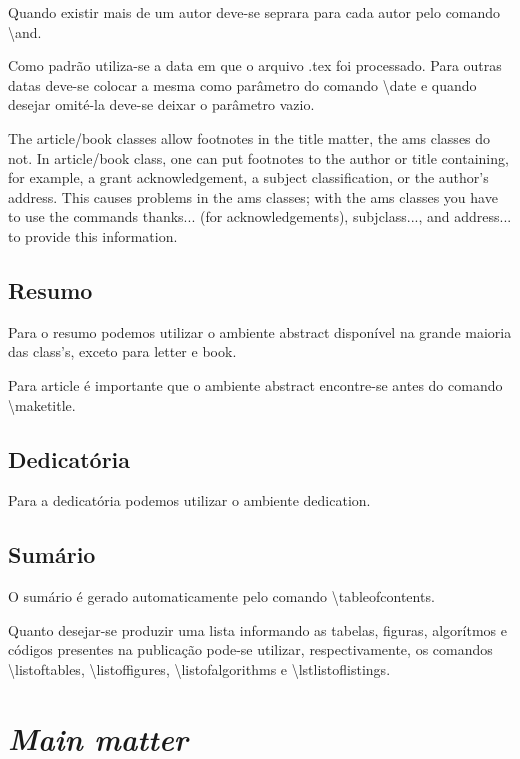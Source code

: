 Quando existir mais de um autor deve-se seprara para cada autor pelo comando \textbackslash\textsf{and}.

Como padrão utiliza-se a data em que o arquivo \textsf{.tex} foi processado. Para outras  datas deve-se colocar a mesma como parâmetro do comando \textbackslash\textsf{date} e quando desejar omité-la deve-se deixar o parâmetro vazio.

The article/book classes allow footnotes in the title matter, the ams classes do not. In article/book class, one can put footnotes to the author or title containing, for example, a grant acknowledgement, a subject classification, or the author's address. This causes problems in the ams classes; with the ams classes you have to use the commands thanks{...} (for acknowledgements), subjclass{...}, and address{...} to provide this information.

\subsection{Resumo}

Para o resumo podemos utilizar o ambiente \textsf{abstract} disponível na grande maioria das \textsf{class}'s, exceto para \textsf{letter} e \textsf{book}.

Para \textsf{article} é importante que o ambiente \textsf{abstract} encontre-se antes do comando \textbackslash\textsf{maketitle}.

\subsection{Dedicatória}

Para a dedicatória podemos utilizar o ambiente \textsf{dedication}.

\subsection{Sumário}

O sumário é gerado automaticamente pelo comando \textbackslash\textsf{tableofcontents}.

Quanto desejar-se produzir uma lista informando as tabelas, figuras, algorítmos e códigos presentes na publicação pode-se utilizar, respectivamente, os comandos \textbackslash\textsf{listoftables}, \textbackslash\textsf{listoffigures}, \textbackslash\textsf{listofalgorithms} e \textbackslash\textsf{lstlistoflistings}.

\section{\textit{Main matter}}

